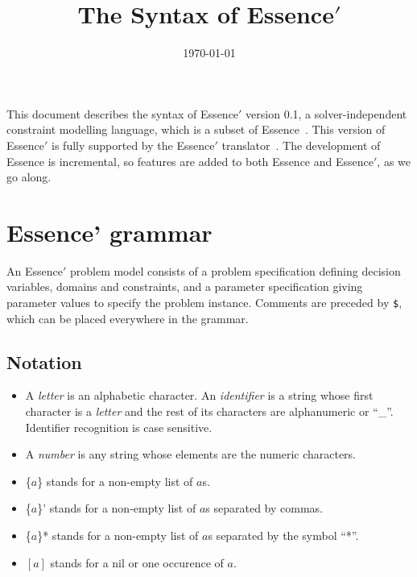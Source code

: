 \documentclass{article}
\begin{document}
\title{The Syntax of {\sc Essence}$'$} %



\date{\today}

\maketitle


This document describes the syntax of  {\sc Essence}$'$ version 0.1, a solver-independent constraint modelling language,
which is a subset of {\sc Essence}~\cite{essence}. This version of
 {\sc Essence}$'$ is fully supported by the {\sc Essence}$'$ translator~\cite{translator}.
 The development of {\sc Essence} is incremental, 
so features are added to both {\sc Essence} and {\sc Essence}$'$, as we go along. 

\section{{\sc Essence'} grammar}

An {\sc Essence}$'$ problem model 
consists of a problem specification defining decision variables, domains and constraints, 
and a parameter specification giving parameter values to specify the problem instance. 
Comments are preceded by {\tt \$}, which can be placed everywhere in the grammar. 

\subsection{Notation}

\begin{itemize}

  \item A \textit{letter} is an alphabetic character. An \textit{identifier} is 
    a string whose first character is a \textit{letter} and the rest of its characters 
    are alphanumeric or ``\_''.  Identifier recognition is case sensitive. 

  \item A \textit{number} is any string whose elements are the numeric characters.
  \item \{$a$\} stands for a non-empty list of $a$s.
  \item \{$a$\}' stands for a non-empty list of $a$s separated by commas.
  \item \{$a$\}* stands for a non-empty list of $a$s separated by the symbol ``*''.
  \item $[a]$ stands for a nil or one occurence of $a$.

\end{itemize}
\end{document}

